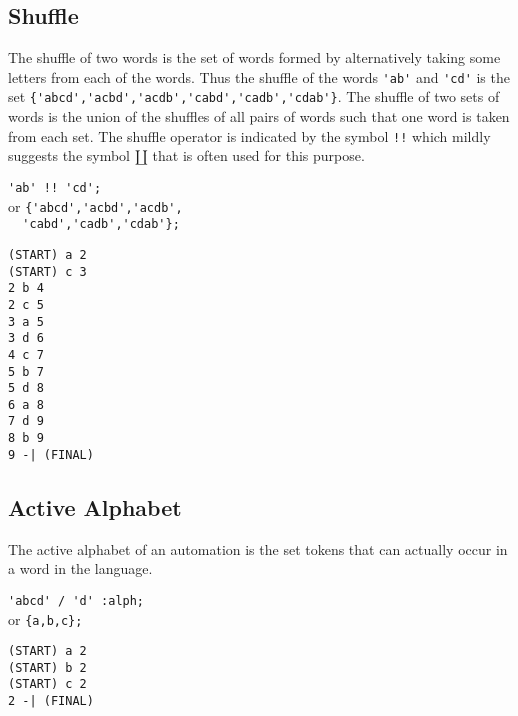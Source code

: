 \subsection{Shuffle}
The shuffle of two words is the set of words formed by alternatively taking
some letters from each of the words.
Thus the shuffle of the words \verb#'ab'# and \verb#'cd'# is the set
\verb#{'abcd','acbd','acdb','cabd','cadb','cdab'}#.
The shuffle of two sets of words is the union of the shuffles of all pairs
of words such that one word is taken from each set.
The shuffle operator is indicated by the symbol \verb#!!# which mildly
suggests the symbol $\amalg$ that is often used for this purpose.
\begin{center}\begin{minipage}[t]{3in}\begin{minipage}[t]{3in}\begin{tabbing}
\qquad \= \verb#'ab' !! 'cd';#\\
or \> \verb#{'abcd','acbd','acdb',#\\
\> \verb#  'cabd','cadb','cdab'};#
\end{tabbing}\end{minipage}\end{minipage}
\begin{minipage}[t]{1.6in}\begin{verbatim}
(START) a 2
(START) c 3
2 b 4
2 c 5
3 a 5
3 d 6
4 c 7
5 b 7
5 d 8
6 a 8
7 d 9
8 b 9
9 -| (FINAL)
\end{verbatim}\end{minipage}\end{center}

\subsection{Active Alphabet}
The active alphabet of an automation is the set tokens that can actually
occur in a word in the language.
\begin{center}\begin{minipage}[t]{3in}\begin{minipage}[t]{3in}\begin{tabbing}
\qquad \= \verb#'abcd' / 'd' :alph;#\\
or \> \verb#{a,b,c};#
\end{tabbing}\end{minipage}\end{minipage}
\begin{minipage}[t]{1.6in}\begin{verbatim}
(START) a 2
(START) b 2
(START) c 2
2 -| (FINAL)
\end{verbatim}\end{minipage}\end{center}

